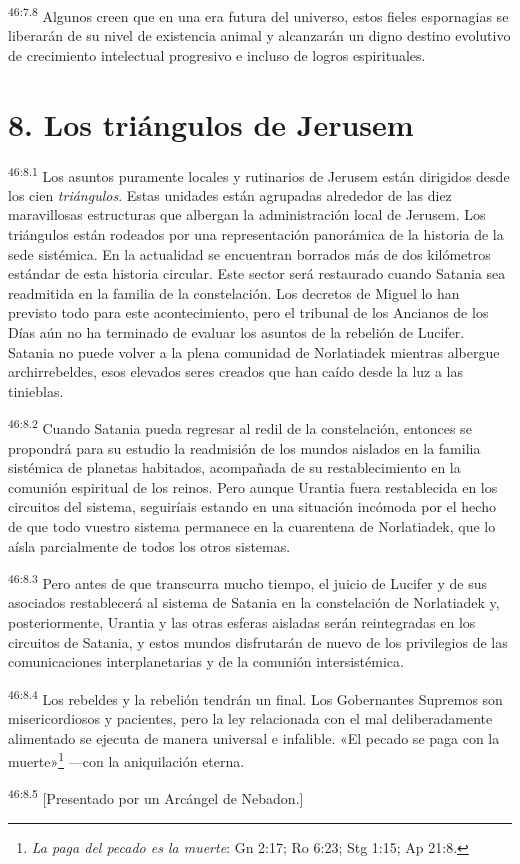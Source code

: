 \par
\textsuperscript{46:7.8} Algunos creen que en una era futura del universo, estos fieles espornagias se liberarán de su nivel de existencia animal y alcanzarán un digno destino evolutivo de crecimiento intelectual progresivo e incluso de logros espirituales.

\section*{8. Los triángulos de Jerusem}
\par
\textsuperscript{46:8.1} Los asuntos puramente locales y rutinarios de Jerusem están dirigidos desde los cien \textit{triángulos}. Estas unidades están agrupadas alrededor de las diez maravillosas estructuras que albergan la administración local de Jerusem. Los triángulos están rodeados por una representación panorámica de la historia de la sede sistémica. En la actualidad se encuentran borrados más de dos kilómetros estándar de esta historia circular. Este sector será restaurado cuando Satania sea readmitida en la familia de la constelación. Los decretos de Miguel lo han previsto todo para este acontecimiento, pero el tribunal de los Ancianos de los Días aún no ha terminado de evaluar los asuntos de la rebelión de Lucifer. Satania no puede volver a la plena comunidad de Norlatiadek mientras albergue archirrebeldes, esos elevados seres creados que han caído desde la luz a las tinieblas.

\par
\textsuperscript{46:8.2} Cuando Satania pueda regresar al redil de la constelación, entonces se propondrá para su estudio la readmisión de los mundos aislados en la familia sistémica de planetas habitados, acompañada de su restablecimiento en la comunión espiritual de los reinos. Pero aunque Urantia fuera restablecida en los circuitos del sistema, seguiríais estando en una situación incómoda por el hecho de que todo vuestro sistema permanece en la cuarentena de Norlatiadek, que lo aísla parcialmente de todos los otros sistemas.

\par
\textsuperscript{46:8.3} Pero antes de que transcurra mucho tiempo, el juicio de Lucifer y de sus asociados restablecerá al sistema de Satania en la constelación de Norlatiadek y, posteriormente, Urantia y las otras esferas aisladas serán reintegradas en los circuitos de Satania, y estos mundos disfrutarán de nuevo de los privilegios de las comunicaciones interplanetarias y de la comunión intersistémica.

\par
\textsuperscript{46:8.4} Los rebeldes y la rebelión tendrán un final. Los Gobernantes Supremos son misericordiosos y pacientes, pero la ley relacionada con el mal deliberadamente alimentado se ejecuta de manera universal e infalible. «El pecado se paga con la muerte»\footnote{\textit{La paga del pecado es la muerte}: Gn 2:17; Ro 6:23; Stg 1:15; Ap 21:8.} ---con la aniquilación eterna.

\par
\textsuperscript{46:8.5} [Presentado por un Arcángel de Nebadon.]